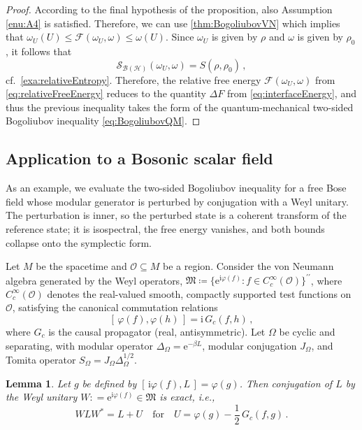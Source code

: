 \documentclass[a4paper, twoside, 11pt, reqno]{amsart}
\theoremstyle{definition}
\theoremstyle{plain}
\newtheorem{lemma}[definition]{Lemma}
\renewcommand{\subset}{\subseteq}
\renewcommand{\Delta}{\varDelta}
\renewcommand{\Omega}{\varOmega}
\newcommand{\MF}{\mathcal{F}}
\newcommand{\MH}{\mathcal{H}}
\newcommand{\MS}{\mathcal{S}}
\newcommand{\MFM}{\mathfrak{M}}
\newcommand{\ii}{\mathrm{i}}
\newcommand{\ee}{\mathrm{e}}
\newcommand{\BO}{\mathscr{B}}
\newcommand{\1}{\mathbf{1}}
\newcommand{\set}[2][]{#1\{{#2}#1\}}
\newcommand{\ce}{\coloneqq}
\newcommand{\ph}{\varphi}
\newcommand{\Gc}{G_{c}}
\begin{document}
\begin{proof}
    According to the final hypothesis of the proposition, also Assumption \ref{enu:A4} is satisfied. Therefore, we can use \cref{thm:BogoliubovVN} which implies that $\omega_U (U) \le \MF (\omega_U, \omega) \le \omega(U)$. Since $\omega_U$ is given by $\rho$ and $\omega$ is given by $\rho_0$, it follows that
    \begin{equation*}
        \MS_{\BO(\MH)} (\omega_U, \omega) = S (\rho, \rho_0) \, ,
    \end{equation*}
    cf.~\cref{exa:relativeEntropy}. Therefore, the relative free energy $\MF (\omega_U, \omega)$ from \cref{eq:relativeFreeEnergy} reduces to the quantity $\Delta F$ from \cref{eq:interfaceEnergy}, and thus the previous inequality takes the form of the quantum-mechanical two-sided Bogoliubov inequality \eqref{eq:BogoliubovQM}.
\end{proof}


\subsection{Application to a Bosonic scalar field}\label{subsec:bosonicField}

As an example, we evaluate the two-sided Bogoliubov inequality for a free Bose field whose modular generator is perturbed by conjugation with a Weyl unitary. The perturbation is inner, so the perturbed state is a coherent transform of the reference state; it is isospectral, the free energy vanishes, and both bounds collapse onto the symplectic form.


Let $M$ be the spacetime and $\mathcal{O} \subset M$ be a region. Consider the von Neumann algebra generated by the Weyl operators, $\MFM \ce \set[\big]{\ee^{\ii \ph(f)} : f \in C_c^\infty(\mathcal{O})}^{\prime\prime}$, where $C_c^\infty(\mathcal{O})$ denotes the real-valued smooth, compactly supported test functions on $\mathcal{O}$, satisfying the canonical commutation relations
\begin{equation}\label{eq:commutationRel}
  [\, \ph(f), \ph(h) \,]=  \ii \, \Gc(f,h) \, ,
\end{equation}
where $\Gc$ is the causal propagator (real, antisymmetric). Let $\Omega$ be cyclic and separating, with modular operator $\Delta_\Omega = \ee^{-\beta L}$, modular conjugation $J_\Omega$, and Tomita operator $S_\Omega = J_\Omega \Delta_\Omega^{1/2}$.  

\begin{lemma}\label{lem:innerPerturbation}
    Let $g$ be defined by $[\, \ii \ph(f), L \,] = \ph(g)$. Then conjugation of $L$ by the Weyl unitary $W: = \ee^{\ii \ph(f)}\in \MFM$ is exact, i.e.,
    \begin{equation*}
      W L W^\ast = L + U \quad \text{for} \quad U = \ph(g) - \frac{1}{2} \, \Gc(f,g) \, .
    \end{equation*}
\end{lemma}
\end{document}
